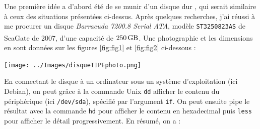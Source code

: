 \documentclass[a4paper,french,bookmarks]{article}
\begin{document}
    Une première idée a d'abord été de se munir d'un disque dur , qui serait similaire à ceux des situations présentées ci-dessus. Après quelques recherches, j'ai réussi à me procurer un disque \emph{Barracuda 7200.8 Serial ATA}, modèle \texttt{ST3250823AS} de \textsf{SeaGate\textsuperscript{\tiny\textregistered}} de 2007, d'une capacité de $\qty{250}{\giga\byte}$. Une photographie et les dimensions en sont données sur les figures \ref{fig:fig1} et \ref{fig:fig2} ci-dessous :
    \begin{center}
        \begin{minipage}{0.4\linewidth}
            \begin{center}
                \texttt{[image: ../Images/disqueTIPEphoto.png]}
                
                \label{fig:fig1}
            \end{center}
        \end{minipage}
        \begin{minipage}{0.1\linewidth}
            \hfill
        \end{minipage}
        \begin{minipage}{0.4\linewidth}
            \begin{center}
    
                \label{fig:fig2}
            \end{center}
        \end{minipage}
    \end{center}
    En connectant le disque à un ordinateur sous un système d'exploitation (ici \textsf{Debian}), on peut grâce à la commande Unix \texttt{dd} afficher le contenu du périphérique (ici \texttt{/dev/sda}), spécifié par l'argument \texttt{if}. On peut ensuite pipe le résultat avec la commande \texttt{hd} pour afficher le contenu en hexadecimal puis \texttt{less} pour afficher le détail progressivement. En résumé, on a :
\end{document}
